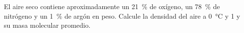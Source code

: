 El aire seco contiene aproximadamente un \SI{21}{\percent} de oxígeno, un \SI{78}{\percent} de nitrógeno y un \SI{1}{\percent} de argón en peso. Calcule la densidad del aire a \SI{0}{\celsius} y \SI{1}{\atm} y su masa molecular promedio.
